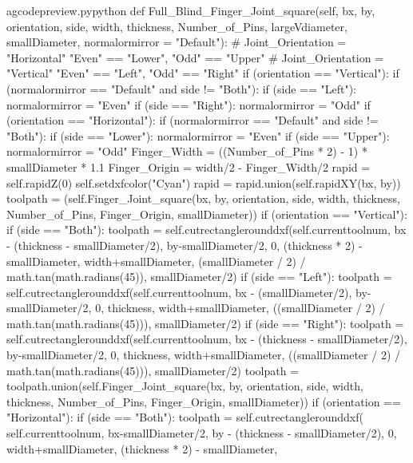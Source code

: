 \documentclass{ltxdoc}
\begin{document}
\begin{writecode}{a}{gcodepreview.py}{python}
    def Full_Blind_Finger_Joint_square(self, bx, by, orientation, side, width, thickness, Number_of_Pins, largeVdiameter, smallDiameter, normalormirror = "Default"):
#     Joint_Orientation = "Horizontal" "Even" == "Lower", "Odd" == "Upper"
#     Joint_Orientation = "Vertical" "Even" == "Left", "Odd" == "Right"
        if (orientation == "Vertical"):
            if (normalormirror == "Default" and side != "Both"):
                if (side == "Left"):
                    normalormirror = "Even"
                if (side == "Right"):
                    normalormirror = "Odd"
        if (orientation == "Horizontal"):
            if (normalormirror == "Default" and side != "Both"):
                if (side == "Lower"):
                    normalormirror = "Even"
                if (side == "Upper"):
                    normalormirror = "Odd"
        Finger_Width = ((Number_of_Pins * 2) - 1) * smallDiameter * 1.1
        Finger_Origin = width/2 - Finger_Width/2
        rapid = self.rapidZ(0)
        self.setdxfcolor("Cyan")
        rapid = rapid.union(self.rapidXY(bx, by))
        toolpath = (self.Finger_Joint_square(bx, by, orientation, side, width, thickness, Number_of_Pins, Finger_Origin, smallDiameter))
        if (orientation == "Vertical"):
            if (side == "Both"):
                toolpath = self.cutrectanglerounddxf(self.currenttoolnum, bx - (thickness - smallDiameter/2), by-smallDiameter/2, 0, (thickness * 2) - smallDiameter, width+smallDiameter, (smallDiameter / 2) / math.tan(math.radians(45)), smallDiameter/2)
            if (side == "Left"):
                toolpath = self.cutrectanglerounddxf(self.currenttoolnum, bx - (smallDiameter/2), by-smallDiameter/2, 0, thickness, width+smallDiameter, ((smallDiameter / 2) / math.tan(math.radians(45))), smallDiameter/2)
            if (side == "Right"):
                toolpath = self.cutrectanglerounddxf(self.currenttoolnum, bx - (thickness - smallDiameter/2), by-smallDiameter/2, 0, thickness, width+smallDiameter, ((smallDiameter / 2) / math.tan(math.radians(45))), smallDiameter/2)
        toolpath = toolpath.union(self.Finger_Joint_square(bx, by, orientation, side, width, thickness, Number_of_Pins, Finger_Origin, smallDiameter))
        if (orientation == "Horizontal"):
            if (side == "Both"):
                toolpath = self.cutrectanglerounddxf(
                    self.currenttoolnum, 
                    bx-smallDiameter/2, 
                    by - (thickness - smallDiameter/2), 
                    0, 
                    width+smallDiameter, 
                    (thickness * 2) - smallDiameter, 

\end{writecode}
\end{document}
